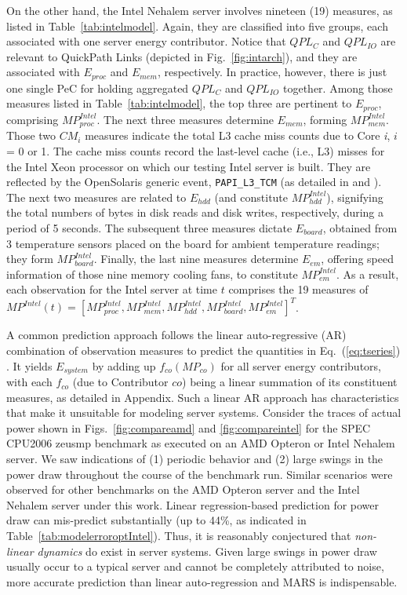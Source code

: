 \documentclass[acmtaco]{acmtrans2m}
\newcommand{\equationname}{Eq.}
\newcommand{\figurenames}{Figs.}
\newcommand{\figurename}{Fig.}
\begin{document}
On the other hand, the Intel Nehalem server involves nineteen (19) measures, as
listed in Table~\ref{tab:intelmodel}.  Again, they are classified into five
groups, each associated with one server energy contributor.
Notice that $QPL_{C}$ and $QPL_{IO}$ are relevant to QuickPath Links
(depicted in \figurename~\ref{fig:intarch}),
and they are associated with $E_{proc}$ and $E_{mem}$, respectively.
In practice, however, there is just one single PeC for holding aggregated
$QPL_{C}$ and $QPL_{IO}$ together.
Among those measures listed in Table~\ref{tab:intelmodel},
the top three are pertinent to $E_{proc}$, comprising $MP_{proc}^{Intel}$.
The next three measures determine $E_{mem}$, forming $MP_{mem}^{Intel}$.
Those two $CM_{i}$ measures indicate the total L3 cache miss counts
due to Core \textit{i}, $i$ = 0 or 1.
The cache miss counts record the last-level cache (i.e., L3) misses
for the Intel Xeon processor on which our testing Intel
server is built.  They are reflected by the OpenSolaris generic event,
\texttt{PAPI\_L3\_TCM} (as detailed in \cite{Sun2008b} and \cite{Intel2009}).
The next two measures are related to $E_{hdd}$ (and constitute $MP_{hdd}^{Intel}$),
signifying the total numbers of bytes in disk reads and disk writes,
respectively, during a period of 5 seconds.
The subsequent three measures dictate $E_{board}$, obtained
from 3 temperature sensors placed on the board for ambient temperature readings;
they form $MP_{board}^{Intel}$.
Finally, the last nine measures determine $E_{em}$, offering speed
information of those nine memory cooling fans, to constitute $MP_{em}^{Intel}$.
As a result, each observation for the Intel server at time $t$ comprises the 19 measures of
$MP^{Intel}(t) =\left[MP_{proc}^{Intel}, MP_{mem}^{Intel}, MP_{hdd}^{Intel}, MP_{board}^{Intel}, MP_{em}^{Intel}\right]^{T}$.

A common prediction approach follows the linear auto-regressive (AR)
combination of observation measures to predict the quantities in
\equationname~(\ref{eq:tseries})  \cite{Lewis2008}.
It yields $E_{system}$ by adding up $f_{co}(MP_{co})$ for all server energy
contributors, with each $f_{co}$ (due to Contributor $co$) being a
linear summation of its constituent measures, as detailed in Appendix.
Such a linear AR approach has characteristics that make it unsuitable
for modeling server systems.  Consider the traces of actual power shown
in \figurenames~\ref{fig:compareamd} and \ref{fig:compareintel} for the
SPEC CPU2006 zeusmp benchmark as executed on an AMD Opteron or Intel
Nehalem server.  We saw indications of (1) periodic behavior and (2)
large swings in the power draw throughout the course of the benchmark run.
Similar scenarios were observed for other benchmarks on 
the AMD Opteron server and the Intel Nehalem server under this work.
Linear regression-based prediction for power draw can
mis-predict substantially (up to 44\%, as indicated in
Table~\ref{tab:modelerroroptIntel}).  Thus, it is reasonably conjectured
that \textit{non-linear dynamics} do exist in server systems.  Given
large swings in power draw usually occur to a typical server and cannot
be completely attributed to noise, more accurate prediction than linear
auto-regression and MARS \cite{Friedman1991} is indispensable.
\end{document}
